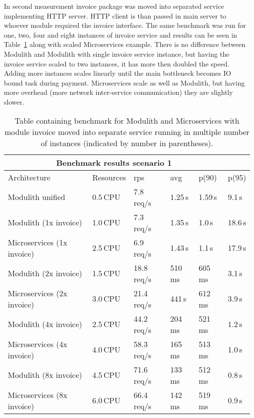 In second measurement invoice package was moved into separated service implementing HTTP server. HTTP client is than passed in main server to whoever module required the invoice interface. The same benchmark was run for one, two, four and eight instances of invoice service and results can be seen in Table~\ref{table:benchmark_modulith_instances} along with scaled Microservices example. There is no difference between Modulith and Modulith with single invoice service instance, but having the invoice service scaled to two instances, it has more then doubled the speed. Adding more instances scales linearly until the main bottleneck becomes IO bound task during payment. Microservices scale as well as Modulith, but having more overhead (more network inter-service communication) they are slightly slower.

\begin{table}
    \begin{tabular}{ |p{4cm}||p{3cm}|p{1.5cm}|p{1.5cm}|p{1.5cm}|p{1.5cm}| }
        \hline
        \multicolumn{5}{|c|}{Benchmark results scenario 1}                                  \\
        \hline
        Architecture                & Resources & rps         & avg     & p(90)   & p(95)   \\
        \hline
        Modulith unified            & 0.5\,CPU  & 7.8\,req/s  & 1.25\,s & 1.59\,s & 9.1\,s  \\
        \rowcolor{Gray}
        Modulith (1x invoice)       & 1.0\,CPU  & 7.3\,req/s  & 1.35\,s & 1.0\,s  & 18.6\,s \\
        \rowcolor{Gray}
        Microservices (1x invoice)  & 2.5\,CPU  & 6.9\,req/s  & 1.43\,s & 1.1\,s  & 17.9\,s \\
        Modulith (2x invoice)       & 1.5\,CPU  & 18.8\,req/s & 510\,ms & 605\,ms & 3.1\,s  \\
        Microservices (2x invoice)  & 3.0\,CPU  & 21.4\,req/s & 441\,s  & 612\,ms & 3.9\,s  \\
        \rowcolor{Gray}
        Modulith (4x invoice)       & 2.5\,CPU  & 44.2\,req/s & 204\,ms & 521\,ms & 1.2\,s  \\
        \rowcolor{Gray}
        Microservices  (4x invoice) & 4.0\,CPU  & 58.3\,req/s & 165\,ms & 513\,ms & 1.0\,s  \\
        Modulith (8x invoice)       & 4.5\,CPU  & 71.6\,req/s & 133\,ms & 512\,ms & 0.8\,s  \\
        Microservices (8x invoice)  & 6.0\,CPU  & 66.4\,req/s & 142\,ms & 519\,ms & 0.9\,s  \\
        \hline
    \end{tabular}
    \caption{Table containing benchmark for Modulith and Microservices with module invoice moved into separate service running in multiple number of instances (indicated by number in parentheses).\label{table:benchmark_modulith_instances}}
\end{table}


